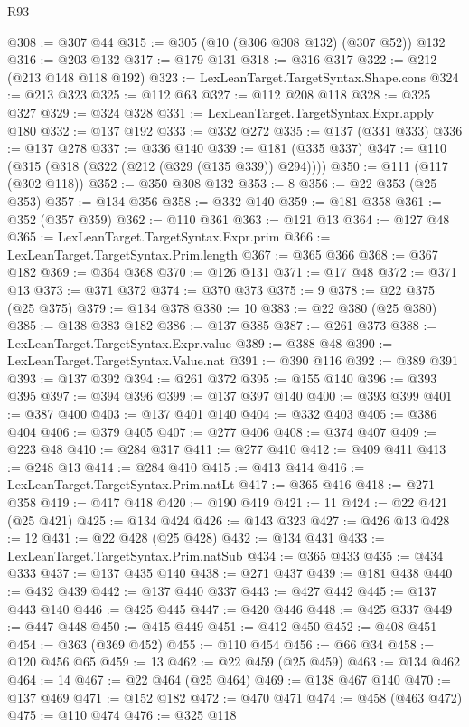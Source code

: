 \begin{lexlean}{R93}
\begin{coremodule}
@308 := @307 @44
@315 := @305 (@10 (@306 @308 @132) (@307 @52)) @132
@316 := @203 @132
@317 := @179 @131
@318 := @316 @317
@322 := @212 (@213 @148 @118 @192)
@323 := LexLeanTarget.TargetSyntax.Shape.cons
@324 := @213 @323
@325 := @112 @63
@327 := @112 @208 @118
@328 := @325 @327
@329 := @324 @328
@331 := LexLeanTarget.TargetSyntax.Expr.apply @180
@332 := @137 @192
@333 := @332 @272
@335 := @137 (@331 @333)
@336 := @137 @278
@337 := @336 @140
@339 := @181 (@335 @337)
@347 := @110 (@315 (@318 (@322 (@212 (@329 (@135 @339)) @294))))
@350 := @111 (@117 (@302 @118))
@352 := @350 @308 @132
@353 := 8
@356 := @22 @353 (@25 @353)
@357 := @134 @356
@358 := @332 @140
@359 := @181 @358
@361 := @352 (@357 @359)
@362 := @110 @361
@363 := @121 @13
@364 := @127 @48
@365 := LexLeanTarget.TargetSyntax.Expr.prim
@366 := LexLeanTarget.TargetSyntax.Prim.length
@367 := @365 @366
@368 := @367 @182
@369 := @364 @368
@370 := @126 @131
@371 := @17 @48
@372 := @371 @13
@373 := @371 @372
@374 := @370 @373
@375 := 9
@378 := @22 @375 (@25 @375)
@379 := @134 @378
@380 := 10
@383 := @22 @380 (@25 @380)
@385 := @138 @383 @182
@386 := @137 @385
@387 := @261 @373
@388 := LexLeanTarget.TargetSyntax.Expr.value
@389 := @388 @48
@390 := LexLeanTarget.TargetSyntax.Value.nat
@391 := @390 @116
@392 := @389 @391
@393 := @137 @392
@394 := @261 @372
@395 := @155 @140
@396 := @393 @395
@397 := @394 @396
@399 := @137 @397 @140
@400 := @393 @399
@401 := @387 @400
@403 := @137 @401 @140
@404 := @332 @403
@405 := @386 @404
@406 := @379 @405
@407 := @277 @406
@408 := @374 @407
@409 := @223 @48
@410 := @284 @317
@411 := @277 @410
@412 := @409 @411
@413 := @248 @13
@414 := @284 @410
@415 := @413 @414
@416 := LexLeanTarget.TargetSyntax.Prim.natLt
@417 := @365 @416
@418 := @271 @358
@419 := @417 @418
@420 := @190 @419
@421 := 11
@424 := @22 @421 (@25 @421)
@425 := @134 @424
@426 := @143 @323
@427 := @426 @13
@428 := 12
@431 := @22 @428 (@25 @428)
@432 := @134 @431
@433 := LexLeanTarget.TargetSyntax.Prim.natSub
@434 := @365 @433
@435 := @434 @333
@437 := @137 @435 @140
@438 := @271 @437
@439 := @181 @438
@440 := @432 @439
@442 := @137 @440 @337
@443 := @427 @442
@445 := @137 @443 @140
@446 := @425 @445
@447 := @420 @446
@448 := @425 @337
@449 := @447 @448
@450 := @415 @449
@451 := @412 @450
@452 := @408 @451
@454 := @363 (@369 @452)
@455 := @110 @454
@456 := @66 @34
@458 := @120 @456 @65
@459 := 13
@462 := @22 @459 (@25 @459)
@463 := @134 @462
@464 := 14
@467 := @22 @464 (@25 @464)
@469 := @138 @467 @140
@470 := @137 @469
@471 := @152 @182
@472 := @470 @471
@474 := @458 (@463 @472)
@475 := @110 @474
@476 := @325 @118

\end{coremodule}
\end{lexlean}

